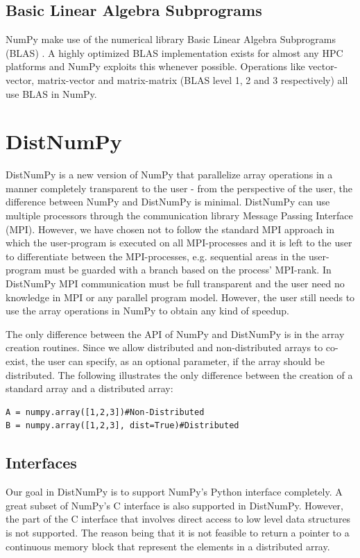\documentclass[10pt]{article}
\begin{document}
\subsection{Basic Linear Algebra Subprograms}
NumPy make use of the numerical library Basic Linear Algebra Subprograms (BLAS) \cite{blas79}. A highly optimized BLAS implementation exists for almost any HPC platforms and NumPy exploits this whenever possible. Operations like vector-vector, matrix-vector and matrix-matrix (BLAS level 1, 2 and 3 respectively) all use BLAS in NumPy. 


\section{DistNumPy}
DistNumPy\cite{distnumpy09} is a new version of NumPy that parallelize array operations in a manner completely transparent to the user - from the perspective of the user, the difference between NumPy and DistNumPy is minimal. DistNumPy can use multiple processors through the communication library Message Passing Interface (MPI)\cite{mpi}. However, we have chosen not to follow the standard MPI approach in which the user-program is executed on all MPI-processes and it is left to the user to differentiate between the MPI-processes, e.g. sequential areas in the user-program must be guarded with a branch based on the process' MPI-rank. In DistNumPy MPI communication must be full transparent and the user need no knowledge in MPI or any parallel program model. However, the user still needs to use the array operations in NumPy to obtain any kind of speedup.

The only difference between the API of NumPy and DistNumPy is in the array creation routines. Since we allow distributed and non-distributed arrays to co-exist, the user can specify, as an optional parameter, if the array should be distributed. The following illustrates the only difference between the creation of a standard array and a distributed array:
\lstset{frame=none, xleftmargin=0mm, numbers=none}
\begin{lstlisting}
A = numpy.array([1,2,3])#Non-Distributed
B = numpy.array([1,2,3], dist=True)#Distributed
\end{lstlisting}
\lstset{frame=single, xleftmargin=5mm, numbers=left}


\subsection{Interfaces}
Our goal in DistNumPy is to support NumPy's Python interface completely. A great subset of NumPy's C interface is also supported in DistNumPy. However, the part of the C interface that involves direct access to low level data structures is not supported. The reason being that it is not feasible to return a pointer to a continuous memory block that represent the elements in a distributed array.
\end{document}
